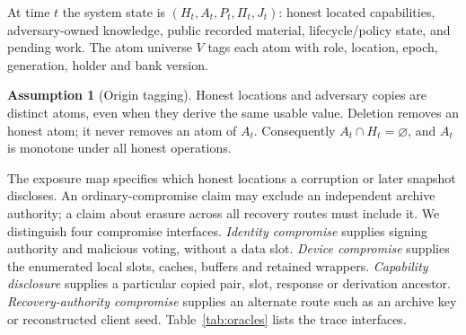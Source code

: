 \documentclass[pdflatex,sn-mathphys-num,twocolumn]{sn-jnl}
\theoremstyle{plain}
\theoremstyle{definition}
\newtheorem{assumption}{Assumption}
\begin{document}
At time $t$ the system state is $(H_t,A_t,P_t,\Pi_t,J_t)$: honest located capabilities, adversary-owned knowledge, public recorded material, lifecycle/policy state, and pending work. The atom universe $V$ tags each atom with role, location, epoch, generation, holder and bank version.

\begin{assumption}[Origin tagging]\label{ass:origin}
Honest locations and adversary copies are distinct atoms, even when they derive the same usable value. Deletion removes an honest atom; it never removes an atom of $A_t$. Consequently $A_t\cap H_t=\varnothing$, and $A_t$ is monotone under all honest operations.
\end{assumption}

The exposure map specifies which honest locations a corruption or later snapshot discloses. An ordinary-compromise claim may exclude an independent archive authority; a claim about erasure across all recovery routes must include it. We distinguish four compromise interfaces. \emph{Identity compromise} supplies signing authority and malicious voting, without a data slot. \emph{Device compromise} supplies the enumerated local slots, caches, buffers and retained wrappers. \emph{Capability disclosure} supplies a particular copied pair, slot, response or derivation ancestor. \emph{Recovery-authority compromise} supplies an alternate route such as an archive key or reconstructed client seed. Table~\ref{tab:oracles} lists the trace interfaces.
\end{document}
